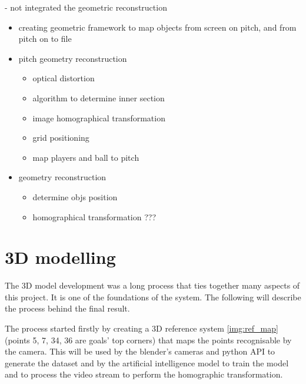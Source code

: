 \documentclass[
    11pt,
    twoside
]{report}
\begin{document}
- not integrated the geometric reconstruction


\begin{itemize}
\item
creating geometric framework to map objects from screen on pitch, and from pitch on to file
\end{itemize}

\begin{itemize}
\item
  pitch geometry reconstruction

  \begin{itemize}
  \item
    optical distortion
  \item
    algorithm to determine inner section
  \item
    image homographical transformation
  \item
    grid positioning
  \item
    map players and ball to pitch
  \end{itemize}
\end{itemize}


\begin{itemize}
\item
    geometry reconstruction
    \begin{itemize}
      \item
        determine objs position
      \item
        homographical transformation ???
    \end{itemize}
\end{itemize}





\section{3D modelling}


The 3D model development was a long process that ties together many aspects of this project. It is one of the foundations of the system. The following will describe the process behind the final result.


The process started firstly by creating a 3D reference system \ref{img:ref_map} (points 5, 7, 34, 36 are goals' top corners) that maps the points recognisable by the camera. This will be used by the blender's cameras and python API to generate the dataset and by the artificial intelligence model to train the model and to process the video stream to perform the homographic transformation.
\end{document}
